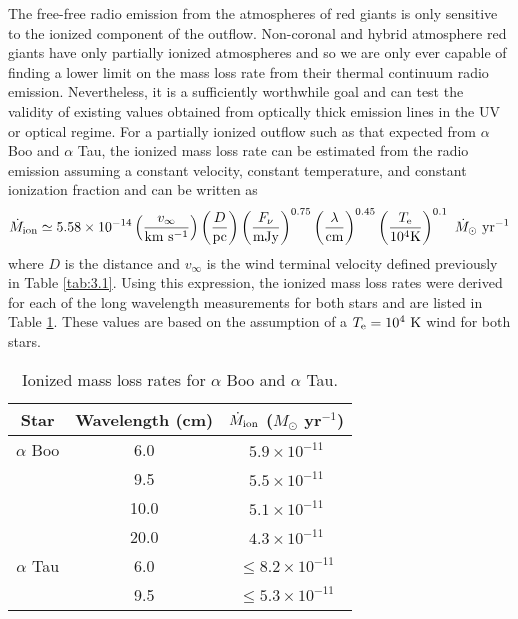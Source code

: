 The free-free radio emission from the atmospheres of red giants is only sensitive to the ionized component of the outflow. Non-coronal and hybrid atmosphere red giants have only partially ionized atmospheres and so we are only ever capable of finding a lower limit on the mass loss rate from their thermal continuum radio emission. Nevertheless, it is a sufficiently worthwhile goal and can test the validity of existing values obtained from optically thick emission lines in the UV or optical regime. For a partially ionized outflow such as that expected from $\alpha$ Boo and $\alpha$ Tau, the ionized mass loss rate can be estimated from the radio emission assuming a constant velocity, constant temperature, and constant ionization fraction and can be written as  
\begin{equation}
\dot{M}_{\rm{ion}} \simeq 5.58 \times 10^{-14} \left(\frac{v_{\infty}}{\rm{km \  s^{-1}}}\right) \left(\frac{D}{\rm{pc}}\right)\left( \frac{F_{\nu}}{\rm{mJy}} \right)^{0.75} \left( \frac{\lambda}{\rm{cm}} \right)^{0.45} \left( \frac{T_{\rm{e}}}{10^4 \rm{K}} \right)^{0.1} \ \dot{M}_{\odot} \ \rm{yr}^{-1} 
\label{eq:6.5b}
\end{equation}
where $D$ is the distance and $v_{\infty}$ is the wind terminal velocity defined previously in Table \ref{tab:3.1}. Using this expression, the ionized mass loss rates were derived for each of the long wavelength measurements for both stars and are listed in Table \ref{tab:6.5b}. These values are based on the assumption of a $T_{\rm{e}} = 10^4 \ \rm{K}$  wind for both stars. 

\begin{table}[!hb]
\begin{center}
\caption[Ionized mass loss rates for $\alpha$ Boo and $\alpha$ Tau.]
{Ionized mass loss rates for $\alpha$ Boo and $\alpha$ Tau.}
\begin{tabular}{ccc}
\hline
\hline
\rule{0pt}{2.5ex}Star & Wavelength (cm) & $\dot{M} _{\rm{ion}}$ ($M _{\odot}$ yr$^{-1}$) \\
\hline
\rule{0pt}{2.5ex}$\alpha$ Boo				& 6.0  & $5.9 \times 10^{-11}$ \\
							& 9.5  & $5.5 \times 10^{-11}$ \\
							& 10.0  & $5.1 \times 10^{-11}$ \\
							& 20.0  & $4.3 \times 10^{-11}$ \\
$\alpha$ Tau				& 6.0  & $\leq 8.2 \times 10^{-11}$ \\
							& 9.5 & $\leq 5.3 \times 10^{-11}$ \\
\hline
\end{tabular}
\label{tab:6.5b}
\end{center}
\end{table}

